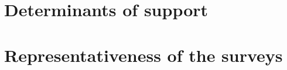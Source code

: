 

\clearpage
\section{Determinants of support}\label{app:determinants}

%         

\clearpage
\section{Representativeness of the surveys}\label{app:representativeness}

%         


